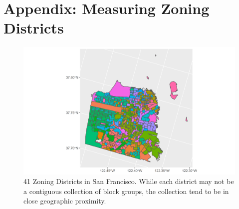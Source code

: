 \documentclass[]{article}
\begin{document}
\newpage
\section{Appendix: Measuring Zoning Districts}\label{appendix:LotSize}

\begin{figure}[hbpt]
	\begin{center}
		\includegraphics[width=\textwidth]{SF_MAP.png}

		\caption{41 Zoning Districts in San Francisco. While each district may not be a contiguous collection of block groups, the collection tend to be in close geographic proximity. }\label{ZoningDistrict}
	\end{center}
\end{figure}
\end{document}
